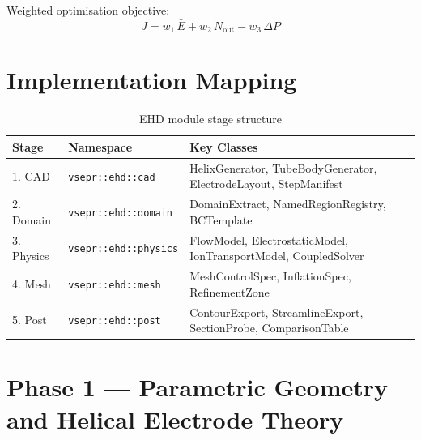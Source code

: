 \documentclass[11pt,a4paper]{article}
\begin{document}
Weighted optimisation objective:
\begin{equation}
  J = w_1\,\bar{E} + w_2\,\dot{N}_{\mathrm{out}} - w_3\,\Delta P
\end{equation}

\section{Implementation Mapping}

\begin{table}[h]
\centering
\caption{EHD module stage structure}
\begin{tabular}{@{}lll@{}}
\toprule
Stage & Namespace & Key Classes \\
\midrule
1. CAD       & \texttt{vsepr::ehd::cad}     & HelixGenerator, TubeBodyGenerator, ElectrodeLayout, StepManifest \\
2. Domain    & \texttt{vsepr::ehd::domain}   & DomainExtract, NamedRegionRegistry, BCTemplate \\
3. Physics   & \texttt{vsepr::ehd::physics}  & FlowModel, ElectrostaticModel, IonTransportModel, CoupledSolver \\
4. Mesh      & \texttt{vsepr::ehd::mesh}     & MeshControlSpec, InflationSpec, RefinementZone \\
5. Post      & \texttt{vsepr::ehd::post}     & ContourExport, StreamlineExport, SectionProbe, ComparisonTable \\
\bottomrule
\end{tabular}
\end{table}


\section{Phase 1 — Parametric Geometry and Helical Electrode Theory}
\label{sec:phase1}
\end{document}
